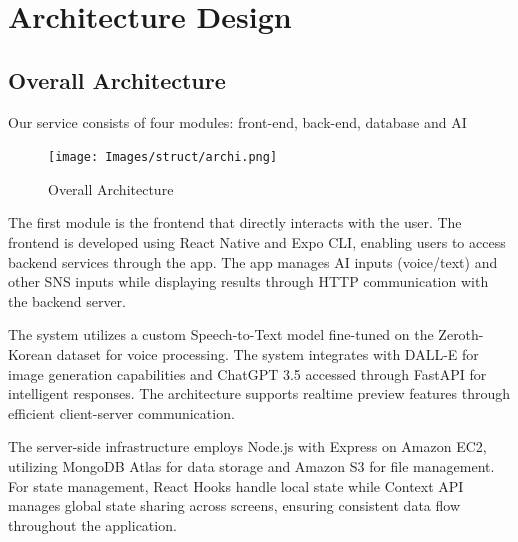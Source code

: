 \documentclass[conference]{IEEEtran}
\begin{document}
\section{Architecture Design}
    \subsection{Overall Architecture}
        Our service consists of four modules: front-end, back-end, database and AI\\
            \begin{figure}[htbp]
                \centerline{\texttt{[image: Images/struct/archi.png]}}
                \label{fig}
                \caption{Overall Architecture}
            \end{figure}
            
                The first module is the frontend that directly interacts with the user. The frontend is developed using React Native and Expo CLI, enabling users to access backend services through the app. The app manages AI inputs (voice/text) and other SNS inputs while displaying results through HTTP communication with the backend server.
                
                The system utilizes a custom Speech-to-Text model fine-tuned on the Zeroth-Korean dataset for voice processing. The system integrates with DALL-E for image generation capabilities and ChatGPT 3.5 accessed through FastAPI for intelligent responses. The architecture supports realtime preview features through efficient client-server communication.
                
                The server-side infrastructure employs Node.js with Express on Amazon EC2, utilizing MongoDB Atlas for data storage and Amazon S3 for file management. For state management, React Hooks handle local state while Context API manages global state sharing across screens, ensuring consistent data flow throughout the application.
            
\end{document}
